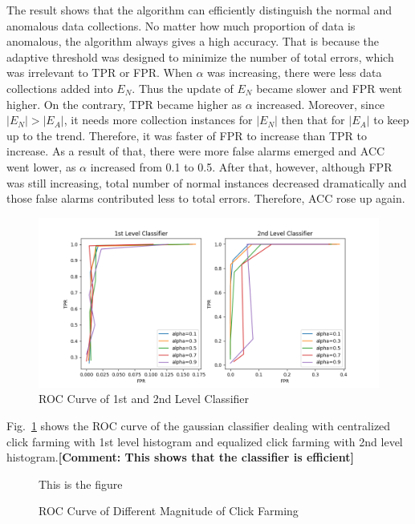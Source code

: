 \documentclass[a4paper]{IEEEtran}
\begin{document}
			The result shows that the algorithm can efficiently distinguish the normal and anomalous data collections. No matter how much proportion of data is anomalous, the algorithm always gives a high accuracy. That is because the adaptive threshold was designed to minimize the number of total errors, which was irrelevant to TPR or FPR. When $\alpha$ was increasing, there were less data collections added into $E_N$. Thus the update of $E_N$ became slower and FPR went higher. On the contrary, TPR became higher as $\alpha$ increased. Moreover, since $|E_N| > |E_A|$, it needs more collection instances for $|E_N|$ then that for $|E_A|$ to keep up to the trend. Therefore, it was faster of FPR to increase than TPR to increase. As a result of that, there were more false alarms emerged and ACC went lower, as $\alpha$ increased from 0.1 to 0.5. After that, however, although FPR was still increasing, total number of normal instances decreased dramatically and those false alarms contributed less to total errors. Therefore, ACC rose up again.
			
			\begin{figure}[!ht]
				\centering
				\includegraphics[width=\linewidth]{fig/ROC-alpha}
				\caption{ROC Curve of 1st and 2nd Level Classifier}
				\label{fig:roc-alpha}
			\end{figure}
			
			Fig.~\ref{fig:roc-alpha} shows the ROC curve of the gaussian classifier dealing with centralized click farming with 1st level histogram and equalized click farming with 2nd level histogram.\textbf{[Comment: This shows that the classifier is efficient]}
			
			\begin{figure}[!ht]
				\centering
				This is the figure
				\caption{ROC Curve of Different Magnitude of Click Farming}
				\label{fig:roc-magnitude}
			\end{figure}
			
\end{document}

